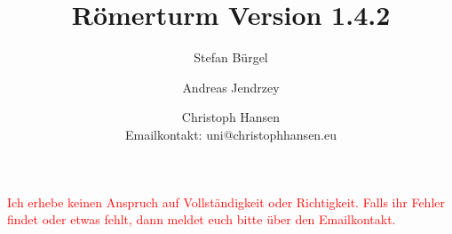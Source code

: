 \documentclass[a5paper,9pt,fleqn,twoside]{scrartcl}
\title{Römerturm Version 1.4.2}
\author{Stefan Bürgel \and Andreas Jendrzey \and Christoph Hansen \\ 
Emailkontakt: uni@christophhansen.eu}
\date{}
\begin{document}
\thispagestyle{empty}
\cleardoublepage
\maketitle


\textcolor{red}{Ich erhebe keinen Anspruch auf Vollständigkeit oder Richtigkeit. Falls ihr Fehler findet oder etwas fehlt, dann meldet euch bitte über den Emailkontakt.}

\setcounter{page}{1}
\begin{multicols}{2}
	\tableofcontents
\end{multicols}
	\pagebreak
	
	
	
	
	
	
	
	
\pagestyle{empty}
\clearpage
\section*{ }
\clearpage
\section*{ }
\end{document}
